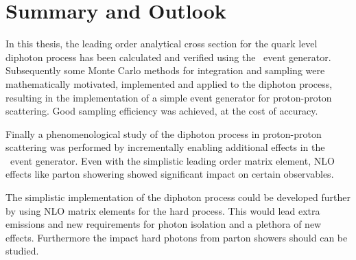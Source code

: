 \chapter{Summary and Outlook}%
\label{chap:summary}

In this thesis, the leading order analytical cross section for the
quark level diphoton process has been calculated and verified using
the \sherpa\ event generator. Subsequently some Monte Carlo methods
for integration and sampling were mathematically motivated,
implemented and applied to the diphoton process, resulting in the
implementation of a simple event generator for proton-proton
scattering. Good sampling efficiency was achieved, at the cost of
accuracy.

Finally a phenomenological study of the diphoton process in
proton-proton scattering was performed by incrementally enabling
additional effects in the \sherpa\ event generator. Even with the
simplistic leading order matrix element, NLO effects like parton
showering showed significant impact on certain observables.

The simplistic implementation of the diphoton process could be
developed further by using NLO matrix elements for the hard
process. This would lead extra emissions and new requirements for
photon isolation and a plethora of new effects. Furthermore the impact
hard photons from parton showers should can be studied.

